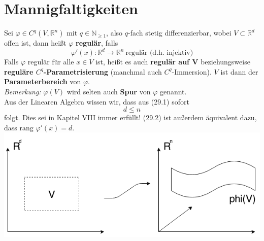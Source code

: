 \documentclass[a4paper,12pt,portrait]{book}
\newcommand{\rang}{\text{rang\ }}
\theoremstyle{theoremstyle}
\begin{document}
\section{Mannigfaltigkeiten}
Sei $\varphi\in C^q(V,\mathbb{R}^n)$ mit $q\in\mathbb{N}_{\geq 1}$, also $q$-fach stetig differenzierbar, wobei $V\subset\mathbb{R}^d$ offen ist, dann heißt $\varphi$ \textbf{regulär}, falls
\begin{equation}
\varphi'(x):\mathbb{R}^d\rightarrow\mathbb{R}^n \ \text{regulär (d.h. injektiv)}
\end{equation}
Falls $\varphi$ regulär für alle $x\in V$ ist, heißt es auch \textbf{regulär auf V} beziehungsweise \textbf{reguläre $C^q$-Parametrisierung} (manchmal auch $C^q$-Immersion). $V$ ist dann der \textbf{Parameterbereich} von $\varphi$.\\
\emph{Bemerkung:} $\varphi(V)$ wird selten auch \textbf{Spur} von $\varphi$ genannt.\\
\linebreak\linebreak
Aus der Linearen Algebra wissen wir, dass aus (29.1) sofort 
\begin{equation}
d\leq n
\end{equation}
folgt. Dies sei in Kapitel VIII immer erfüllt! (29.2) ist außerdem äquivalent dazu, dass $\rang \varphi'(x)=d$.\\
\includegraphics[scale=0.5]{pictures/MA2_0001}
\end{document}
